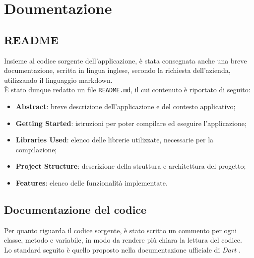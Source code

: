 

\section{Doumentazione}
\label{sec:documentation}

\subsection*{README}
\label{sec:readme}

Insieme al codice sorgente dell'applicazione, è stata consegnata anche una breve documentazione, scritta in lingua inglese, secondo la richiesta dell'azienda, utilizzando il linguaggio \gls{markdown}\glsoccur.\\
È stato dunque redatto un file \lstinline{README.md}, il cui contenuto è riportato di seguito:
\begin{itemize}
    \item \textbf{Abstract}: breve descrizione dell'applicazione e del contesto applicativo;
    \item \textbf{Getting Started}: istruzioni per poter compilare ed eseguire l'applicazione;
    \item \textbf{Libraries Used}: elenco delle librerie utilizzate, necessarie per la compilazione;
    \item \textbf{Project Structure}: descrizione della struttura e architettura del progetto;
    \item \textbf{Features}: elenco delle funzionalità implementate.
\end{itemize}


\subsection*{Documentazione del codice}
\label{sec:documentazione-codice}

Per quanto riguarda il codice sorgente, è stato scritto un commento per ogni classe, metodo e variabile, in modo da rendere più chiara la lettura del codice.\\
Lo standard seguito è quello proposto nella documentazione ufficiale di \emph{Dart} \cite{site:comment}. \\

